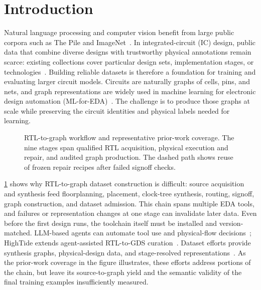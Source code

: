 \section{Introduction}
\label{sec:intro}

Natural language processing and computer vision benefit from large public corpora such as The Pile
and ImageNet~\cite{gao2021pile,deng2009imagenet}. In integrated-circuit (IC) design, public data that
combine diverse designs with trustworthy physical annotations remain scarce: existing collections
cover particular design sets, implementation stages, or
technologies~\cite{chowdhury2021openabcd,chai2022circuitnet,shi2025forgeeda,shrestha2026edaschema,zhou2026r2g}.
Building reliable datasets is therefore a foundation for training and evaluating larger circuit
models. Circuits are naturally graphs of cells, pins, and nets, and graph representations are widely
used in machine learning for electronic design automation
(ML-for-EDA)~\cite{chowdhury2021openabcd,liang2023circuitops,zhou2026r2g}. The challenge is to produce
those graphs at scale while preserving the circuit identities and physical labels needed for
learning.

\begin{figure}[t]
  \centering
  \caption{RTL-to-graph workflow and representative prior-work coverage. The nine stages span
  qualified RTL acquisition, physical execution and repair, and audited graph production. The dashed
  path shows reuse of frozen repair recipes after failed signoff checks.}
  \label{fig:overview}
\end{figure}

\cref{fig:overview} shows why RTL-to-graph dataset construction is difficult: source acquisition and
synthesis feed floorplanning, placement, clock-tree synthesis, routing, signoff, graph construction,
and dataset admission. This chain spans multiple EDA tools, and failures or representation changes at
one stage can invalidate later data. Even before the first design runs, the toolchain itself must be
installed and version-matched. LLM-based agents can automate tool use and physical-flow
decisions~\cite{he2024chateda,ghose2026orfsagent,deng2026rtlgds}; HighTide extends agent-assisted
RTL-to-GDS curation~\cite{goldblatt2026hightide}. Dataset efforts provide synthesis graphs,
physical-design data, and stage-resolved
representations~\cite{chowdhury2021openabcd,chai2022circuitnet,shi2025forgeeda,shrestha2026edaschema,zhou2026r2g}.
As the prior-work coverage in the figure illustrates, these efforts address portions of the chain,
but leave its source-to-graph yield and the semantic validity of the final training examples
insufficiently measured.

